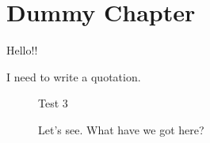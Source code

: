 \chapter{Dummy Chapter}

Hello!!

I need to write a quotation.

\begin{quotation}
\lipsum[1-2]
\end{quotation}

\begin{figure}[hbt!]
\centering Test 3
\caption{Let's see. What have we got here?}
\end{figure}